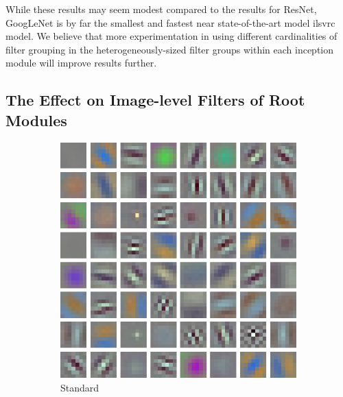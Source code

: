 \documentclass[thesis]{subfiles}
\begin{document}
	While these results may seem modest compared to the results for ResNet, GoogLeNet is by far the smallest and fastest near state-of-the-art model \gls{ilsvrc} model. We believe that more experimentation in using different cardinalities of filter grouping in the heterogeneously-sized filter groups within each inception module will improve results further.
	
	\subsection{The Effect on Image-level Filters of Root Modules}
	\begin{figure}[tb]
		\centering
		\begin{subfigure}[b]{0.45\textwidth}
			\centering
			\includegraphics[width=\textwidth]{Figs/Raster/msrc-resnet-50-conv1}
			\caption{Standard}
			\label{fig:resnet50normalconv0}
		\end{subfigure}
		~
		\begin{subfigure}[b]{0.45\textwidth}
			\centering

\end{subfigure}
\end{figure}
\end{document}
